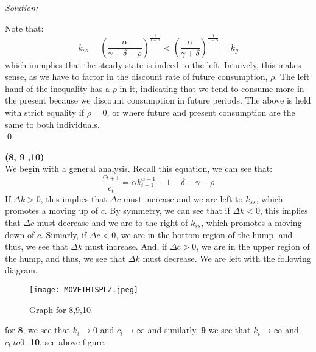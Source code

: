 \documentclass[12pt]{article}
\newenvironment{subsol}
    {\emph{Solution:}
    }
    {
    \qed
    }
\begin{document}
\begin{subsol}
    Note that:
    \[
    k_{ss} = \left( \frac{\alpha}{\gamma + \delta + \rho} \right)^\frac{1}{1-\alpha} < \left( \frac{\alpha}{\gamma + \delta} \right)^\frac{1}{1-\alpha} = k_g
    \]
    which immplies that the steady state is indeed to the left. Intuively, this makes sense, as we have to factor in the discount rate of future consumption, $\rho$. The left hand of the inequality has a $\rho$ in it, indicating that we tend to consume more in the present because we discount consumption in future periods. The above is held with strict equality if $\rho = 0$, or where future and present consumption are the same to both individuals. \\
\end{subsol}

\noindent
\textbf{(8, 9 ,10)} \hspace{1cm}\\
We begin with a general analysis. Recall this equation, we can see that:
\[
    \frac{c_{t+1}}{c_t} = \alpha k^{\alpha - 1}_{t+1} + 1 - \delta - \gamma - \rho
\]
If $\Delta k > 0$, this implies that $\Delta c$ must increase and we are left to $k_{ss}$, which promotes a moving up of $c$. By symmetry, we can see that if $\Delta k < 0$, this implies that $\Delta c$ must decrease and we are to the right of $k_{ss}$, which promotes a moving down of $c$. Simiarly, if $\Delta c < 0$, we are in the bottom region of the hump, and thus, we see that $\Delta k$ must increase. And, if $\Delta c > 0$, we are in the upper region of the hump, and thus, we see that $\Delta k$ must decrease. We are left with the following diagram. 

\begin{figure}[H]
    \centering
    \texttt{[image: MOVETHISPLZ.jpeg]}
    \caption{Graph for 8,9,10}
    \label{fig:enter-label}
\end{figure}

for \textbf{8}, we see that $k_t \to 0$ and $c_t \to \infty$ and similarly, \textbf{9} we see that $k_t \to \infty$ and $c_t \ to 0$. \textbf{10}, see above figure. 
\end{document}
